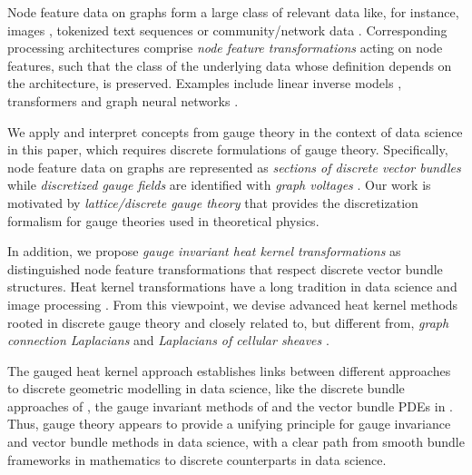 \documentclass[10pt,reqno]{amsart}
\numberwithin{equation}{section}
\theoremstyle{bfnote}
\theoremstyle{bfdef}
\begin{document}
	Node feature data on graphs form a large class of relevant data like, for instance, images \cite{Aubert:2006aa,Handbook:2023aa}, tokenized text sequences \cite{vaswani2017attention,Siino:2024aa,Jia:2025aa} or community/network data \cite{Battiston:2020aa,Boguna:2021aa}.
	Corresponding processing architectures comprise \textit{node feature transformations} acting on node features, such that the class of the underlying data whose definition depends on the architecture, is preserved. Examples include linear inverse models \cite{Tarantola:2005aa,groetschLinearInverseProblems2011,Arridge:2019wu}, transformers \cite{vaswani2017attention} and graph neural networks \cite{kipfSemiSupervisedClassificationGraph2017a,bronstein2017geometric}. 

	We apply and interpret concepts from gauge theory in the context of data science in this paper, which requires discrete formulations of gauge theory. Specifically, node feature data on graphs are represented as \textit{sections of discrete vector bundles} while \textit{discretized gauge fields} are identified with \textit{graph voltages} \cite{grossTopologicalGraphTheory1987}.
	Our work is motivated by \textit{lattice/discrete gauge theory} \cite{baezSpinNetworkStates1996,Gattringer:2010zz,jiangGaugeTheoryGraphs2023} that provides the discretization formalism for gauge theories used in theoretical physics.
	
	In addition, we propose \textit{gauge invariant heat kernel transformations} as distinguished node feature transformations that respect discrete vector bundle structures.
	 Heat kernel transformations have a long tradition in data science and image processing \cite{Lindeberg:1994aa,Lindeberg:2022aa}. From this viewpoint, we devise advanced heat kernel methods rooted in discrete gauge theory and closely related to, but different from, \textit{graph connection Laplacians} \cite{Singer:2012aa} and \textit{Laplacians of cellular sheaves} \cite{hansenSpectralTheoryCellular2019a}.

	The gauged heat kernel approach establishes links between different approaches to discrete geometric modelling in data science, like the discrete bundle approaches of \cite{hansenOpinionDynamicsDiscourse2021,bodnarNeuralSheafDiffusion2023,bambergerBundleNeuralNetworks2024}, the gauge invariant methods of \cite{weilerCoordinateIndependentConvolutional2021,gerkenGeometricDeepLearning2021} and the vector bundle PDEs in \cite{batardHeatEquationsVector2011,batardClassGeneralizedLaplacians2014,batardHighOrderDIPVBTVImage2025}.
	Thus, gauge theory appears to provide a unifying principle for gauge invariance and vector bundle methods in data science, 
	with a clear path from smooth bundle frameworks in mathematics to discrete counterparts in data science.
\end{document}

